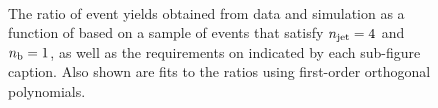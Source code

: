 \begin{figure}[h!]
\begin{center}
    \\
    \caption{The ratio of event yields obtained from data and simulation as a function of \mht [GeV] based on a sample of \mj events that satisfy $n_{\text{jet}} = 4$ and $n_{\text{b}} = 1$, as well as the requirements on \scalht indicated by each sub-figure caption. Also shown are fits to the ratios using first-order orthogonal polynomials.}
    \label{fig:mhtval_Mu_eq4j_eq1b}
  \end{center}
\end{figure}

